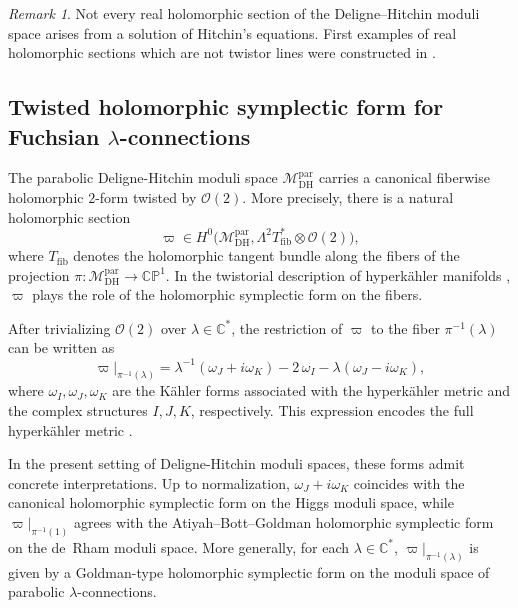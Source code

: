\documentclass[12pt,a4paper]{amsart}
\theoremstyle{definition}
\theoremstyle{remark}
\newtheorem{remark}[theorem]{Remark}
\newcommand{\C}{\mathbb C}
\newcommand{\CP}{\mathbb{CP}}
\begin{document}
\begin{remark}
Not every real holomorphic section of the Deligne--Hitchin moduli space arises
from a solution of Hitchin's equations.
First examples of real holomorphic sections which are not twistor lines were constructed
in \cite{HH}.
\end{remark}
 
 
 \subsection{Twisted holomorphic symplectic form for Fuchsian $\lambda$-connections}

The parabolic Deligne-Hitchin moduli space 
\(\mathcal M_{\mathrm{DH}}^{\mathrm{par}}\) carries a canonical fiberwise holomorphic
\(2\)-form twisted by \(\mathcal O(2)\). More precisely, there is a
natural holomorphic section
\[
\varpi \in H^0\!\bigl(\mathcal M_{\mathrm{DH}}^{\mathrm{par}},
\Lambda^2 T^*_{\mathrm{fib}} \otimes \mathcal O(2)\bigr),
\]
where \(T_{\mathrm{fib}}\) denotes the holomorphic tangent bundle along the fibers of
the projection \(\pi\colon \mathcal M_{\mathrm{DH}}^{\mathrm{par}}\to\CP^1\).
In the twistorial description of hyperk\"ahler manifolds \cite{HKLR}, \(\varpi\) plays
the role of the holomorphic symplectic form on the fibers.

After trivializing \(\mathcal O(2)\) over \(\lambda\in \C^*\),
the restriction of \(\varpi\) to the fiber \(\pi^{-1}(\lambda)\) can be written as
\begin{equation}\label{eq:varphilambda}
\varpi\big|_{\pi^{-1}(\lambda)}
=
\lambda^{-1}(\omega_J+i\omega_K)
-2\,\omega_I
-\lambda(\omega_J-i\omega_K),
\end{equation}
where \(\omega_I,\omega_J,\omega_K\) are the K\"ahler forms associated with the
hyperk\"ahler metric and the complex structures \(I,J,K\), respectively. This expression encodes the full hyperk\"ahler metric \cite{HKLR}.

In the present setting of Deligne-Hitchin moduli spaces, these forms admit concrete interpretations. Up to
normalization, \(\omega_J+i\omega_K\) coincides with the canonical holomorphic
symplectic form on the Higgs moduli space, while
\(\varpi|_{\pi^{-1}(1)}\) agrees with the Atiyah--Bott--Goldman holomorphic symplectic
form on the de~Rham moduli space. More generally, for each \(\lambda\in\C^*\),
\(\varpi|_{\pi^{-1}(\lambda)}\) is given by a Goldman-type holomorphic symplectic form
on the moduli space of parabolic \(\lambda\)-connections. 
\end{document}
